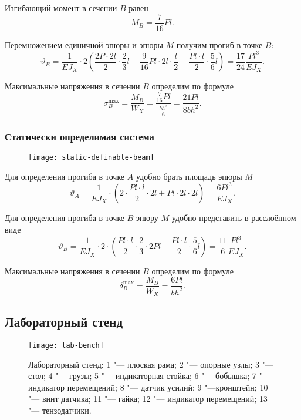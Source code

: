 Изгибающий момент в сечении $B$ равен
\[
    M_B = \frac{7}{16} P l.
\]

Перемножением единичной эпюры и эпюры $M$ получим прогиб в точке $B$:
\[
    \vartheta_B
    = \frac{1}{E J_X} \cdot 2 \left(\frac{2 P \cdot 2 l}{2} \cdot \frac{2}{3} l - \frac{9}{16} P l \cdot 2 l \cdot \frac{l}{2} - \frac{P l \cdot l}{2} \cdot \frac{5}{6} l\right)
    = \frac{17}{24} \frac{P l^3}{E J_X}.
\]

Максимальные напряжения в сечении $B$ определим по формуле
\[
    \sigma_B^{\max}
    = \frac{M_B}{W_X}
    = \frac{\frac{7}{16} P l}{\frac{b h^2}{6}}
    = \frac{21 P l}{8 b h^2}.
\]

\subsubsection{Статически определимая система}

\begin{figure}[!ht]
    \centering
    \texttt{[image: static-definable-beam]}
    \caption{
    }
    \label{fig:static-definable-beam}
\end{figure}

Для определения прогиба в точке $A$ удобно брать площадь эпюры $M$
\[
    \vartheta_A
    = \frac{1}{E J_X} \cdot \left(2 \cdot \frac{P l \cdot l}{2} \cdot 2 l + P l \cdot 2 l \cdot 2 l\right)
    = \frac{6 P l^3}{E J_X}.
\]

Для определения прогиба в точке $B$ эпюру $M$ удобно представить в расслоённом виде
\[
    \vartheta_B
    = \frac{1}{E J_X} \cdot 2 \cdot \left(\frac{P l \cdot l}{2} \cdot \frac{2}{3} \cdot 2 P l - \frac{P l \cdot l}{2} \cdot \frac{5}{6} l\right)
    = \frac{11}{6} \frac{P l^3}{E J_X}.
\]

Максимальные напряжения в сечении $B$ определим по формуле
\[
    \delta_B^{\max}
    = \frac{M_B}{W_X}
    = \frac{6 P l}{b h^2}.
\]

\subsection{Лабораторный стенд}

\begin{figure}[!ht]
    \centering
    \texttt{[image: lab-bench]}
    \caption{Лабораторный стенд:
        1 "--- плоская рама;
        2 "--- опорные узлы;
        3 "--- стол;
        4 "--- грузы;
        5 "--- индикаторная стойка;
        6 "--- бобышка;
        7 "---  индикатор  перемещений;
        8 "---  датчик  усилий;
        9 "---кронштейн;
        10 "--- винт датчика;
        11 "--- гайка;
        12 "--- индикатор перемещений;
        13 "--- тензодатчики.
    }
    \label{fig:lab-bench}
\end{figure}

